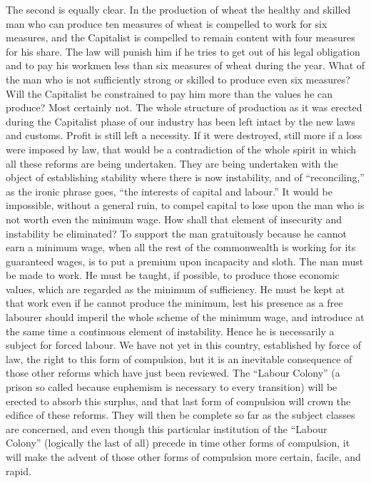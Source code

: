 \documentclass{book}
\begin{document}
The second is equally clear. In the production of wheat the healthy and skilled man who can produce ten measures of wheat is compelled to work for six measures, and the Capitalist is compelled to remain content with four measures for his share. The law will punish him if he tries to get out of his legal obligation and to pay his workmen less than six measures of wheat during the year. What of the man who is not sufficiently strong or skilled to produce even six measures? Will the Capitalist be constrained to pay him more than the values he can produce? Most certainly not. The whole structure of production as it was erected during the Capitalist phase of our industry has been left intact by the new laws and customs. Profit is still left a necessity. If it were destroyed, still more if a loss were imposed by law, that would be a contradiction of the whole spirit in which all these reforms are being undertaken. They are being undertaken with the object of establishing stability where there is now instability, and of “reconciling,” as the ironic phrase goes, “the interests of capital and labour.” It would be impossible, without a general ruin, to compel capital to lose upon the man who is not worth even the minimum wage. How shall that element of insecurity and instability be eliminated? To support the man gratuitously because he cannot earn a minimum wage, when all the rest of the commonwealth is working for its guaranteed wages, is to put a premium upon incapacity and sloth. The man must be made to work. He must be taught, if possible, to produce those economic values, which are regarded as the minimum of sufficiency. He must be kept at that work even if he cannot produce the minimum, lest his presence as a free labourer should imperil the whole scheme of the minimum wage, and introduce at the same time a continuous element of instability. Hence he is necessarily a subject for forced labour. We have not yet in this country, established by force of law, the right to this form of compulsion, but it is an inevitable consequence of those other reforms which have just been reviewed. The “Labour Colony” (a prison so called because euphemism is necessary to every transition) will be erected to absorb this surplus, and that last form of compulsion will crown the edifice of these reforms. They will then be complete so far as the subject classes are concerned, and even though this particular institution of the “Labour Colony” (logically the last of all) precede in time other forms of compulsion, it will make the advent of those other forms of compulsion more certain, facile, and rapid.
\end{document}
